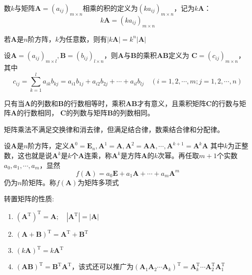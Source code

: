 \begin{definition}[矩阵的数乘]
    数$k$与矩阵$\boldsymbol{A}={(a_{ij})}_{m\times n}$相乘的积的定义为${(ka_{ij})}_{m\times n}$，记为$k\boldsymbol{A}$：
    $$k\boldsymbol{A}={(ka_{ij})}_{m\times n}$$
\end{definition}

\begin{theorem}[方阵的数乘与其行列式]
    若$\boldsymbol{A}$是$n$阶方阵，$k$为任意数，则有$|k\boldsymbol{A}|=k^n|\boldsymbol{A}|$
\end{theorem}

\begin{definition}[矩阵的乘法]
    设$\boldsymbol{A}={(a_{ij})}_{m\times l},\boldsymbol{B}={(b_{ij})}_{l\times n}$，则$\boldsymbol{A}$与$\boldsymbol{B}$的乘积$\boldsymbol{A}\boldsymbol{B}$定义为
    $\boldsymbol{C}={(c_{ij})}_{m\times n}$，其中
    $$c_{ij}=\sum _{k=1}^l a_{ik}b_{kj}=a_{i1}b_{1j}+a_{i2}b_{2j}+\cdots+a_{il}b_{lj}\quad (i=1,2,\cdots,m;j=1,2,\cdots,n)$$
\end{definition}

\begin{remark}
    只有当$\boldsymbol{A}$的列数和$\boldsymbol{B}$的行数相等时，乘积$\boldsymbol{A}\boldsymbol{B}$才有意义，且乘积矩阵$\boldsymbol{C}$的行数与矩阵$\boldsymbol{A}$的行数相同，
    $\boldsymbol{C}$的列数与矩阵$\boldsymbol{B}$的列数相同。

    矩阵乘法不满足交换律和消去律，但满足结合律，数乘结合律和分配律。
\end{remark}

\begin{definition}[矩阵多项式]
    设$\boldsymbol{A}$是$n$阶方阵，定义$\boldsymbol{A}^0=\boldsymbol{E}_n,\boldsymbol{A}^1=\boldsymbol{A},\boldsymbol{A}^2=\boldsymbol{A}\boldsymbol{A},\cdots,\boldsymbol{A}^{k+1}=\boldsymbol{A}^k\boldsymbol{A}$
    其中$k$为正整数，这也就是说$\boldsymbol{A}^k$是$k$个$\boldsymbol{A}$连乘，称$\boldsymbol{A}^k$是方阵$\boldsymbol{A}$的$k${\heiti 次幂}。再任取$m+1$个实数$a_0,a_1,\cdots,a_m$，显然
    $$f(\boldsymbol{A})=a_0\boldsymbol{E}+a_1\boldsymbol{A}+\cdots+a_m\boldsymbol{A}^m$$
    仍为$n$阶矩阵。称$f(\boldsymbol{A})$为{\heiti 矩阵多项式}
\end{definition}

\begin{theorem}
    转置矩阵的性质:
    \begin{enumerate}
        \item ${({\boldsymbol{A}}^\mathrm{T})}^\mathrm{T}=\boldsymbol{A};\quad |\boldsymbol{A}^\mathrm{T}|=|\boldsymbol{A}|$
        \item ${(\boldsymbol{A}+\boldsymbol{B})}^\mathrm{T}=\boldsymbol{A}^\mathrm{T}+\boldsymbol{B}^\mathrm{T}$
        \item ${(k\boldsymbol{A})}^\mathrm{T}=k\boldsymbol{A}^\mathrm{T}$
        \item ${(\boldsymbol{A}\boldsymbol{B})}^\mathrm{T}=\boldsymbol{B}^\mathrm{T}\boldsymbol{A}^\mathrm{T}$，该式还可以推广为${(\boldsymbol{A}_1\boldsymbol{A}_2\cdots\boldsymbol{A}_k)}^\mathrm{T}=\boldsymbol{A}_k^\mathrm{T}\cdots\boldsymbol{A}_2^\mathrm{T}\boldsymbol{A}_1^\mathrm{T}$
    \end{enumerate}
\end{theorem}

